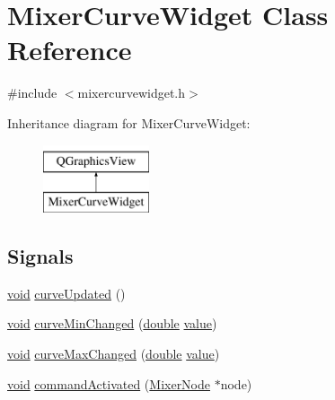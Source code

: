 \hypertarget{class_mixer_curve_widget}{\section{Mixer\-Curve\-Widget Class Reference}
\label{class_mixer_curve_widget}
}


{\ttfamily \#include $<$mixercurvewidget.\-h$>$}

Inheritance diagram for Mixer\-Curve\-Widget\-:\begin{figure}[H]
\begin{center}
\leavevmode
\includegraphics[height=2.000000cm]{class_mixer_curve_widget}
\end{center}
\end{figure}
\subsection*{Signals}
\begin{DoxyCompactItemize}
\item 
\hyperlink{group___u_a_v_objects_plugin_ga444cf2ff3f0ecbe028adce838d373f5c}{void} \hyperlink{group___u_a_v_object_widget_utils_ga90255ec9acd8db01306ae5f9af229f39}{curve\-Updated} ()
\item 
\hyperlink{group___u_a_v_objects_plugin_ga444cf2ff3f0ecbe028adce838d373f5c}{void} \hyperlink{group___u_a_v_object_widget_utils_gac254f263b61538dfab5f1f2a06a7bb12}{curve\-Min\-Changed} (\hyperlink{_super_l_u_support_8h_a8956b2b9f49bf918deed98379d159ca7}{double} \hyperlink{glext_8h_aa0e2e9cea7f208d28acda0480144beb0}{value})
\item 
\hyperlink{group___u_a_v_objects_plugin_ga444cf2ff3f0ecbe028adce838d373f5c}{void} \hyperlink{group___u_a_v_object_widget_utils_gabf78aa6aaa393045db87deb6a481c3b1}{curve\-Max\-Changed} (\hyperlink{_super_l_u_support_8h_a8956b2b9f49bf918deed98379d159ca7}{double} \hyperlink{glext_8h_aa0e2e9cea7f208d28acda0480144beb0}{value})
\item 
\hyperlink{group___u_a_v_objects_plugin_ga444cf2ff3f0ecbe028adce838d373f5c}{void} \hyperlink{group___u_a_v_object_widget_utils_ga967ede8f3f93e35d68361368d7ce8d49}{command\-Activated} (\hyperlink{class_mixer_node}{Mixer\-Node} $\ast$node)
\end{DoxyCompactItemize}
